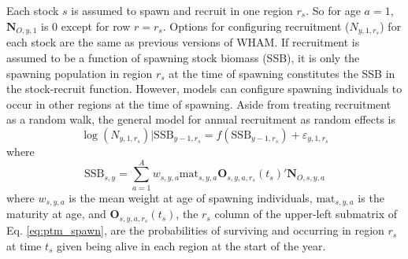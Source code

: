 \documentclass[
]{article}
\begin{document}
Each stock \(s\) is assumed to spawn and recruit in one region \(r_s\).
So for age \(a=1\), \(\mathbf{N}_{O,y,1}\) is 0 except for row
\(r = r_s\). Options for configuring recruitment (\(N_{y,1,r_s}\)) for
each stock are the same as previous versions of WHAM. If recruitment is
assumed to be a function of spawning stock biomass (SSB), it is only the
spawning population in region \(r_s\) at the time of spawning
constitutes the SSB in the stock-recruit function. However, models can
configure spawning individuals to occur in other regions at the time of
spawning. Aside from treating recruitment as a random walk, the general
model for annual recruitment as random effects is \begin{equation*}
\log\left(N_{y,1,r_s}\right)|\text{SSB}_{y-1,r_s} =  f\left(\text{SSB}_{y-1,r_s}\right) + \varepsilon_{y,1,r_s}
\end{equation*} where\\
\[\text{SSB}_{s,y} =  \sum^A_{a=1}  w_{s,y,a} \text{mat}_{s,y,a} \mathbf{O}_{s,y,a,r_s}(t_s)' \mathbf{N}_{O,s,y,a}\]
where \(w_{s,y,a}\) is the mean weight at age of spawning individuals,
\(\text{mat}_{s,y,a}\) is the maturity at age, and
\(\mathbf{O}_{s,y,a,r_s}(t_s)\), the \(r_s\) column of the upper-left
submatrix of Eq. \ref{eq:ptm_spawn}, are the probabilities of surviving
and occurring in region \(r_s\) at time \(t_s\) given being alive in
each region at the start of the year.
\end{document}
